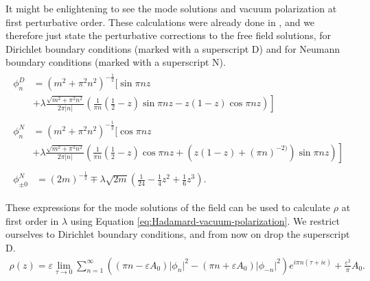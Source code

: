 It might be enlightening to see the mode solutions and vacuum polarization at first perturbative order. These calculations were already done in \cite{Ambj1983, Wernersson2020}, and we therefore just state the perturbative corrections to the free field solutions, for Dirichlet boundary conditions (marked with a superscript D) and for Neumann boundary conditions (marked with a superscript N). 
\begin{align}
	\begin{split}
	\phi_n^{D} &= \left( m^2 + \pi^2  n^2 \right)^{-\frac{1}{2}} \Biggl[ \sin\pi n z \\
		   &\left.+ \lambda \frac{\sqrt{m^2 + \pi^2 n^2} }{2 \pi \lvert n \rvert} 
		\left( 
		\frac{1}{\pi n}\left( \frac{1}{2} - z \right) \sin \pi n z - z(1-z) \cos \pi n z \right) 
	\right] 
	\end{split} 
	\label{eq:perturbative-dirichlet}
	\\
	\begin{split}
	\phi_n^{N} &= \left( m^2 + \pi^2 n^2 \right)^{-\frac{1}{2}} 
	\Biggl[ \cos\pi n z   \\
		   &\left. + \lambda \frac{\sqrt{m^2 + \pi^2 n^2} }{2 \pi \lvert n \rvert} 
		\left( 
		\frac{1}{\pi n}\left( \frac{1}{2} - z \right) \cos \pi n z 
	+ ( z(1-z) + (\pi n)^{-2)} ) \sin \pi n z \right) 
	\right] 
	\end{split}
	\label{eq:perturbative-neumann}
	\\
	\begin{split}
	\phi_{\pm 0 }^{N} &= \left( 2m \right) ^{- \frac{1}{2}} \mp \lambda \sqrt{2m} \left( \frac{1}{24} - \frac{1}{4}z^2 + \frac{1}{6}z^3\right).
	\end{split}
	\label{eq:perturbative-neumann-n-0}
\end{align}

These expressions for the mode solutions of the field can be used to calculate $\rho$ at first order in $\lambda$ using Equation \eqref{eq:Hadamard-vacuum-polarization}. We restrict ourselves to Dirichlet boundary conditions, and from now on drop the superscript D.
\begin{align}
\rho(z) = \varepsilon \lim_{\tau\to 0} \sum_{n=1}^{\infty} \left(  (\pi n - \varepsilon A_0)\lvert \phi_n\rvert ^2 -  (\pi n + \varepsilon A_0)\lvert \phi_{-n}\rvert ^2 \right)  e^{i \pi n (\tau + i \epsilon)} + \frac{\varepsilon^2}{\pi}A_0.
\label{eq:perturbative-vacuum-polarization}
\end{align}

